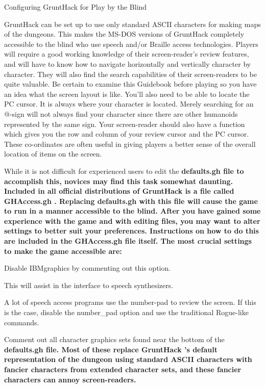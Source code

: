 Configuring GruntHack for Play by the Blind

GruntHack can be set up to use only standard ASCII characters for making
maps of the dungeons. This makes the MS-DOS versions of GruntHack completely
accessible to the blind who use speech and/or Braille access technologies.
Players will require a good working knowledge of their screen-reader's
review features, and will have to know how to navigate horizontally and
vertically character by character. They will also find the search
capabilities of their screen-readers to be quite valuable. Be certain to
examine this Guidebook before playing so you have an idea what the screen
layout is like. You'll also need to be able to locate the PC cursor. It is
always where your character is located. Merely searching for an @-sign will
not always find your character since there are other humanoids represented
by the same sign. Your screen-reader should also have a function which
gives you the row and column of your review cursor and the PC cursor.
These co-ordinates are often useful in giving players a better sense of the
overall location of items on the screen.

While it is not difficult for experienced users to edit the %
\bf defaults.gh \rm%
file to accomplish this, novices may find this task somewhat daunting.
Included in all official distributions of GruntHack is a file called
%
\bf GHAccess.gh\rm%
.  Replacing %
\bf defaults.gh \rm%
with this file will cause
the game to run in a manner accessible to the blind. After you have gained
some experience with the game and with editing files, you may want to alter
settings to better suit your preferences. Instructions on how to do this
are included in the %
\bf GHAccess.gh \rm%
file itself. The most crucial settings to
make the game accessible are:

\blist{}
\item[\tb {IBMgraphics}]
Disable IBMgraphics by commenting out this option.
\item[\tb {menustyle:traditional}]
This will assist in the interface to speech synthesizers.
\item[\tb {number\_pad}]
A lot of speech access programs use the number-pad to review the screen.
If this is the case, disable the number\_pad option and use the traditional
Rogue-like commands.
\item[\tb {``Character graphics''}]
Comment out all character graphics sets found near the bottom of the
%
\bf defaults.gh \rm%
file.  Most of these replace %
\bf GruntHack\rm%
's
default representation of the dungeon using standard ASCII characters
with fancier characters from extended character sets, and these fancier
characters can annoy screen-readers.
\elist
